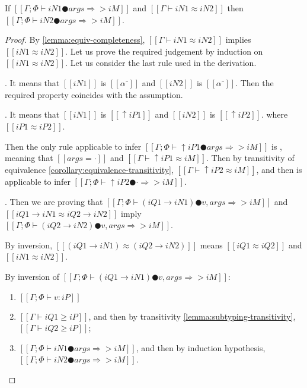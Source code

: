 \begin{lemma} \label{lemma:app-inf-equ-stable}
    If $[[Γ; Φ ⊢ iN1 ● args ⇒> iM]]$ and $[[Γ ⊢ iN1 ≈ iN2]]$ 
    then $[[Γ; Φ ⊢ iN2 ● args ⇒> iM]]$.
\end{lemma}
\begin{proof}
    By \cref{lemma:equiv-completeness}, 
    $[[Γ ⊢ iN1 ≈ iN2]]$ implies $[[iN1 ≈ iN2]]$.
    Let us prove the required judgement by induction on $[[iN1 ≈ iN2]]$.
    Let us consider the last rule used in the derivation.
    \begin{caseof}
        \item {}.
            It means that $[[iN1]]$ is $[[α⁻]]$ and $[[iN2]]$ is $[[α⁻]]$.
            Then the required property coincides with the assumption. 
        \item {}. 
            It means that $[[iN1]]$ is $[[↑iP1]]$ and $[[iN2]]$ is $[[↑iP2]]$.
            where $[[iP1 ≈ iP2]]$.

            Then the only rule applicable to infer $[[Γ; Φ ⊢ ↑iP1 ● args ⇒> iM]]$
            is ,
            meaning that $[[args = ·]]$ and $[[Γ ⊢ ↑iP1 ≈ iM]]$.
            Then by transitivity of equivalence \cref{corollary:equivalence-transitivity},
            $[[Γ ⊢ ↑iP2 ≈ iM]]$, and then  is applicable to infer
            $[[Γ; Φ ⊢ ↑iP2 ● · ⇒> iM]]$.
        
        \item {}.
            Then we are proving that  
            $[[Γ; Φ ⊢ (iQ1 → iN1) ● v, args ⇒> iM]]$ and $[[iQ1 → iN1 ≈ iQ2 → iN2]]$
            imply $[[Γ; Φ ⊢ (iQ2 → iN2) ● v, args ⇒> iM]]$.
            
            By inversion, $[[(iQ1 → iN1) ≈ (iQ2 → iN2)]]$
            means $[[iQ1 ≈ iQ2]]$ and $[[iN1 ≈ iN2]]$.

            By inversion of $[[Γ; Φ ⊢ (iQ1 → iN1) ● v, args ⇒> iM]]$:
            \begin{enumerate}
                \item $[[Γ ; Φ ⊢ v : iP]]$
                \item $[[Γ ⊢ iQ1 ≥ iP]]$,
                    and then by transitivity \cref{lemma:subtyping-transitivity},
                    $[[Γ ⊢ iQ2 ≥ iP]]$;
                \item $[[Γ ; Φ ⊢ iN1 ● args ⇒> iM]]$, 
                    and then by induction hypothesis, $[[Γ ; Φ ⊢ iN2 ● args ⇒> iM]]$.
            \end{enumerate}


\end{caseof}
\end{proof}
